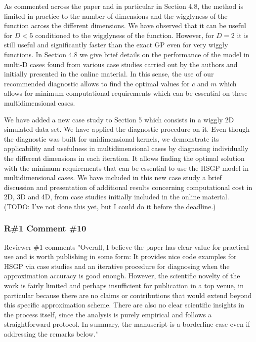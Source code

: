 \documentclass[11pt]{report}
\begin{document}
As commented across the paper and in particular in Section 4.8, the method is limited in practice to the number of dimensions and the wigglyness of the function across the different dimensions. We have observed that it can be useful for $D<5$ conditioned to the wigglyness of the function. However, for $D=2$ it is still useful and significantly faster than the exact GP even for very wiggly functions. In Section 4.8 we give brief details on the performance of the model in multi-D cases found from various case studies carried out by the authors and initially presented in the online material. In this sense, the use of our recommended diagnostic allows to find the optimal values for $c$ and $m$ which allows for minimum computational requirements which can be essential on these multidimensional cases.

We have added a new case study to Section 5 which consists in a wiggly 2D simulated data set. We have applied the diagnostic procedure on it. Even though the diagnostic was built for unidimensional kernels, we demonstrate its applicability and usefulness in multidimensional cases by diagnosing individually the different dimensions in each iteration. It allows finding the  optimal solution with the minimum requirements that can be essential to use the HSGP model in multidimensional cases. We have included in this new case study a brief discussion and presentation of additional results concerning computational cost in 2D, 3D and 4D, from case studies initially included in the online material. {\color{red} (TODO: I've not done this yet, but I could do it before the deadline.)}

\subsubsection*{R\#1 Comment \#10}

Reviewer \#1 comments "Overall, I believe the paper has clear value for practical use and is worth publishing in some form: It provides nice code examples for HSGP via case studies and an iterative procedure for diagnosing when the approximation accuracy is good enough. However, the scientific novelty of the work is fairly limited and perhaps insufficient for publication in a top venue, in particular because there are no claims or contributions that would extend beyond this specific approximation scheme. There are also no clear scientific insights in the process itself, since the analysis is purely empirical and follows a straightforward protocol. In summary, the manuscript is a borderline case even if addressing the remarks below."
\end{document}
